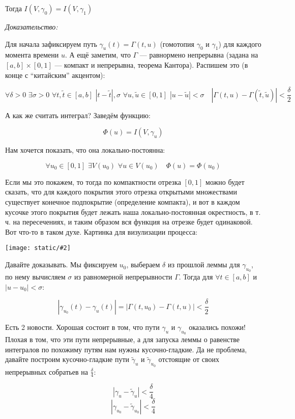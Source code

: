 \documentclass{article}
\def\dbl{\,\,}
\def\images#1#2{\begin{center}\texttt{[image: static/\#2]}\end{center}}
\begin{document}
Тогда $I(V, \gamma_0) = I(V, \gamma_1)$

\textit{Доказательство:}

Для начала зафиксируем путь $\gamma_u(t) = \Gamma(t, u)$ (гомотопия $\gamma_0$ и $\gamma_1$) для каждого момента времени $u$. А ещё заметим, что $\Gamma$ --- равнормено непрерывна (задана на $[a, b] \times [0, 1]$ --- компакт и непрерывна, теорема Кантора). Распишем это (в конце с ``китайским'' акцентом):

\[\forall \delta > 0 \dbl \exists \sigma > 0 \dbl \forall t, \tilde{t} \in [a, b] \dbl |t - \tilde{t}| , \sigma \dbl \forall u, \tilde{u} \in [0, 1] \dbl |u - \tilde{u}| < \sigma \quad |\Gamma(t, u) - \Gamma(\tilde{t}, \tilde{u})| < \frac{\delta}{2}\]

А как же считать интеграл? Заведём функцию:

\[\Phi(u) = I(V, \gamma_u)\]

Нам хочется показать, что она локально-постоянна:

\[\forall u_0 \in [0, 1] \dbl \exists V(u_0) \dbl \forall u \in V(u_0) \quad \Phi(u) = \Phi(u_0)\]

Если мы это покажем, то тогда по компактности отрезка $[0, 1]$ можно будет сказать, что для каждого покрытия этого отрезка открытыми множествами существует конечное подпокрытие (определение компакта), и вот в каждом кусочке этого покрытия будет лежать наша локально-постоянная окрестность, в т. ч. на пересечениях, и таким образом вся функция на отрезке будет одинаковой. Вот что-то в таком духе. Картинка для визулизации процесса:

\images{0.3}{rav_gomotop_put.jpg}

Давайте доказывать. Мы фиксируем $u_0$, выбераем $\delta$ из прошлой леммы для $\gamma_{u_0}$, по нему вычисляем $\sigma$ из равномерной непрерывности $\Gamma$. Тогда для $\forall t \in [a, b]$ и $|u - u_0| < \sigma$:

\[|\gamma_{u_0}(t) - \gamma_{u}(t)| = |\Gamma(t, u_0) - \Gamma(t, u)| < \frac{\delta}{2}\]

Есть 2 новости. Хорошая состоит в том, что пути $\gamma_{u}$ и $\gamma_{u_0}$ оказались похожи! Плохая в том, что эти пути непрерывные, а для запуска леммы о равенстве интегралов по похожиму путям нам нужны кусочно-гладкие. Да не проблема, давайте построим кусочно-гладкие пути $\tilde{\gamma}_{u}$ и $\tilde{\gamma}_{u_0}$ отстоящие от своих непрерывных собратьев на $\frac{\delta}{4}$:

\[|\gamma_{u} - \tilde{\gamma}_{u}| < \frac{\delta}{4}\]
\[|\gamma_{u_0} - \tilde{\gamma}_{u_0}| < \frac{\delta}{4}\]
\end{document}

